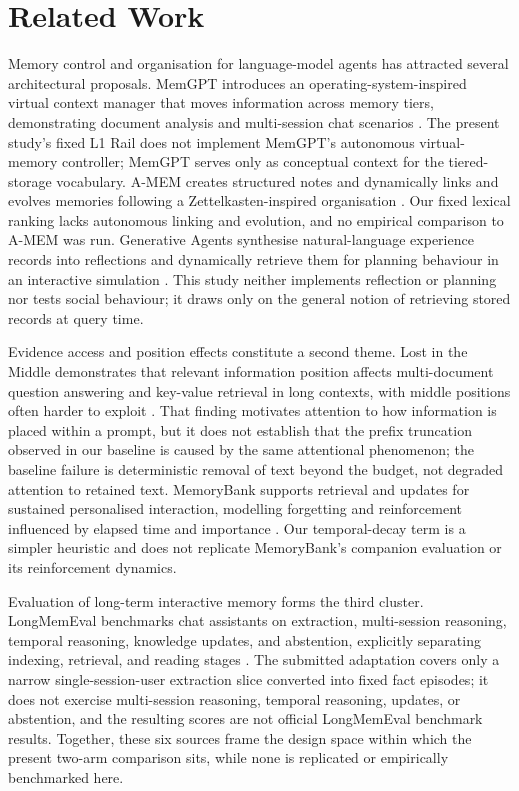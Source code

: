 \section{Related Work}

\label{sec:related_work}

Memory control and organisation for language-model agents has attracted several architectural proposals. MemGPT introduces an operating-system-inspired virtual context manager that moves information across memory tiers, demonstrating document analysis and multi-session chat scenarios \citep{ref_959d6858d034c6e1}. The present study's fixed L1 Rail does not implement MemGPT's autonomous virtual-memory controller; MemGPT serves only as conceptual context for the tiered-storage vocabulary. A-MEM creates structured notes and dynamically links and evolves memories following a Zettelkasten-inspired organisation \citep{ref_1aacba116cbe3c5b}. Our fixed lexical ranking lacks autonomous linking and evolution, and no empirical comparison to A-MEM was run. Generative Agents synthesise natural-language experience records into reflections and dynamically retrieve them for planning behaviour in an interactive simulation \citep{ref_6e953134a3c04402}. This study neither implements reflection or planning nor tests social behaviour; it draws only on the general notion of retrieving stored records at query time.

Evidence access and position effects constitute a second theme. Lost in the Middle demonstrates that relevant information position affects multi-document question answering and key-value retrieval in long contexts, with middle positions often harder to exploit \citep{ref_9dbf664b6954efbc}. That finding motivates attention to how information is placed within a prompt, but it does not establish that the prefix truncation observed in our baseline is caused by the same attentional phenomenon; the baseline failure is deterministic removal of text beyond the budget, not degraded attention to retained text. MemoryBank supports retrieval and updates for sustained personalised interaction, modelling forgetting and reinforcement influenced by elapsed time and importance \citep{ref_713e886950406893}. Our temporal-decay term is a simpler heuristic and does not replicate MemoryBank's companion evaluation or its reinforcement dynamics.

Evaluation of long-term interactive memory forms the third cluster. LongMemEval benchmarks chat assistants on extraction, multi-session reasoning, temporal reasoning, knowledge updates, and abstention, explicitly separating indexing, retrieval, and reading stages \citep{ref_ab2c226739f2f52a}. The submitted adaptation covers only a narrow single-session-user extraction slice converted into fixed fact episodes; it does not exercise multi-session reasoning, temporal reasoning, updates, or abstention, and the resulting scores are not official LongMemEval benchmark results. Together, these six sources frame the design space within which the present two-arm comparison sits, while none is replicated or empirically benchmarked here.
